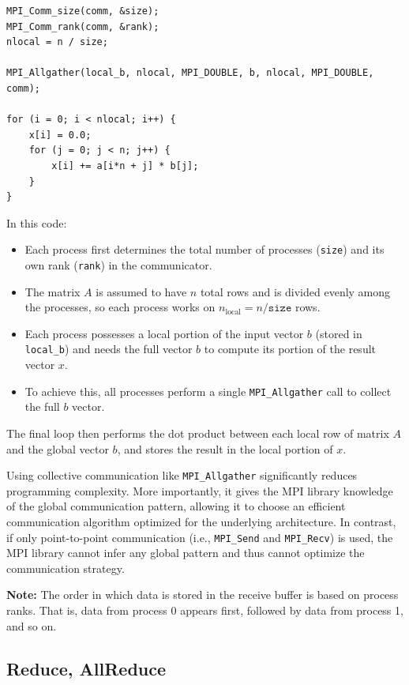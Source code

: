\documentclass[12pt]{book}
\begin{document}
\begin{lstlisting}[style=cppstyle]
MPI_Comm_size(comm, &size);
MPI_Comm_rank(comm, &rank);
nlocal = n / size;

MPI_Allgather(local_b, nlocal, MPI_DOUBLE, b, nlocal, MPI_DOUBLE, comm);

for (i = 0; i < nlocal; i++) {
    x[i] = 0.0;
    for (j = 0; j < n; j++) {
        x[i] += a[i*n + j] * b[j];
    }
}
\end{lstlisting}

In this code:
\begin{itemize}
    \item Each process first determines the total number of processes (\texttt{size}) and its own rank (\texttt{rank}) in the communicator.
    \item The matrix $A$ is assumed to have $n$ total rows and is divided evenly among the processes, so each process works on $n_\text{local} = n / \texttt{size}$ rows.
    \item Each process possesses a local portion of the input vector $b$ (stored in \texttt{local\_b}) and needs the full vector $b$ to compute its portion of the result vector $x$.
    \item To achieve this, all processes perform a single \texttt{MPI\_Allgather} call to collect the full $b$ vector.
\end{itemize}

The final loop then performs the dot product between each local row of matrix $A$ and the global vector $b$, and stores the result in the local portion of $x$.

Using collective communication like \texttt{MPI\_Allgather} significantly reduces programming complexity. More importantly, it gives the MPI library knowledge of the global communication pattern, allowing it to choose an efficient communication algorithm optimized for the underlying architecture. In contrast, if only point-to-point communication (i.e., \texttt{MPI\_Send} and \texttt{MPI\_Recv}) is used, the MPI library cannot infer any global pattern and thus cannot optimize the communication strategy.

\textbf{Note:} The order in which data is stored in the receive buffer is based on process ranks. That is, data from process 0 appears first, followed by data from process 1, and so on.


\subsection{Reduce, AllReduce}
\end{document}

